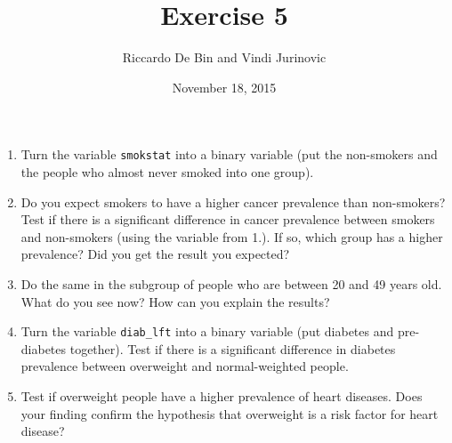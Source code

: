 \documentclass[]{article}
\title{Exercise 5}
\author{Riccardo De Bin and Vindi Jurinovic}
\date{November 18, 2015}
\begin{document}
\maketitle


\begin{enumerate}
\def\labelenumi{\arabic{enumi}.}
\itemsep1pt\parskip0pt
\item
  Turn the variable \texttt{smokstat} into a binary variable (put the
  non-smokers and the people who almost never smoked into one group).\\
\item
  Do you expect smokers to have a higher cancer prevalence than
  non-smokers? Test if there is a significant difference in cancer
  prevalence between smokers and non-smokers (using the variable from
  1.). If so, which group has a higher prevalence? Did you get the
  result you expected?\\
\item
  Do the same in the subgroup of people who are between 20 and 49 years
  old. What do you see now? How can you explain the results?\\
\item
  Turn the variable \texttt{diab\_lft} into a binary variable (put
  diabetes and pre-diabetes together). Test if there is a significant
  difference in diabetes prevalence between overweight and
  normal-weighted people.\\
\item
  Test if overweight people have a higher prevalence of heart diseases.
  Does your finding confirm the hypothesis that overweight is a risk
  factor for heart disease?
\end{enumerate}
\end{document}
